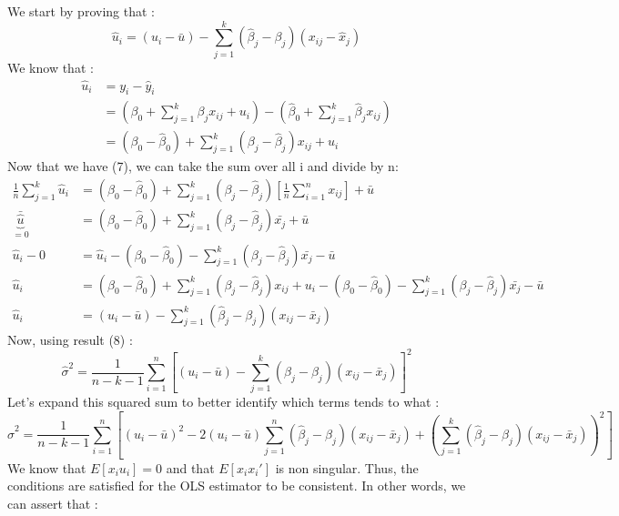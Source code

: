 \documentclass{article}
\begin{document}
We start by proving that : 
\begin{equation}
    \hat{u}_i=(u_i-\bar{u})-\sum_{j=1}^k(\hat{\beta}_j -\beta_j)(x_{ij}-\hat{x}_j)
\end{equation}
We know that : 
\begin{equation}
\begin{aligned}
    \hat{u}_i&=y_i-\hat{y}_i\\
    &= (\beta_0+\sum_{j=1}^k\beta_jx_{ij}+u_i) - (\hat{\beta}_0+\sum_{j=1}^k\hat{\beta}_jx_{ij})\\
    &=(\beta_0 - \hat{\beta}_0)+\sum_{j=1}^k(\beta_j-\hat{\beta}_j)x_{ij} + u_i
\end{aligned}
\end{equation}
Now that we have (7), we can take the sum over all i and divide by n:
\begin{equation}
\begin{aligned}
    \frac{1}{n}\sum_{j=1}^k\hat{u}_i &= (\beta_0-\hat{\beta}_0) + \sum_{j=1}^k(\beta_j-\hat{\beta}_j) [\frac{1}{n}\sum_{i=1}^nx_{ij}] + \bar{u} \\
    \underbrace{\bar{\hat{u}}}_{=0} &= (\beta_0-\hat{\beta}_0) + \sum_{j=1}^k(\beta_j-\hat{\beta}_j)\bar{x_j}+ \bar{u} \\
        \hat{u}_i-0&= \hat{u}_i - (\beta_0-\hat{\beta}_0) - \sum_{j=1}^k(\beta_j-\hat{\beta}_j)\bar{x_j}- \bar{u} \\
        \hat{u}_i &= (\beta_0 - \hat{\beta}_0)+\sum_{j=1}^k(\beta_j-\hat{\beta}_j)x_{ij} + u_i- (\beta_0-\hat{\beta}_0) - \sum_{j=1}^k(\beta_j-\hat{\beta}_j)\bar{x_j}- \bar{u}\\
        \hat{u}_i &= (u_i-\bar{u}) - \sum_{j=1}^k(\hat{\beta}_j-\beta_j)(x_{ij}-\bar{x}_j)
\end{aligned}
\end{equation}
Now, using result (8) : 
\begin{equation}
    \hat{\sigma}^2=\frac{1}{n-k-1}\sum_{i=1}^n[(u_i-\bar{u}) - \sum_{j=1}^k(\hat{\beta}_j-\beta_j)(x_{ij}-\bar{x}_j)]^2
\end{equation}
Let's expand this squared sum to better identify which terms tends to what : 
\begin{equation}
     \hat{\sigma}^2 = \frac{1}{n - k - 1}   \sum_{i=1}^n \left[(u_i - \bar{u})^2    - 2 (u_i-\bar{u})\sum_{j=1}^n(\hat{\beta}_j - \beta_j)(x_{ij} - \bar{x}_j)   + \left( \sum_{j=1}^k (\hat{\beta}_j - \beta_j)(x_{ij} - \bar{x}_j) \right)^2\right]  
\end{equation}
We know that $E[x_iu_i]=0$ and that $E[x_ix_i']$ is non singular. Thus, the conditions are satisfied for the OLS estimator to be consistent. In other words, we can assert that : 
\end{document}
